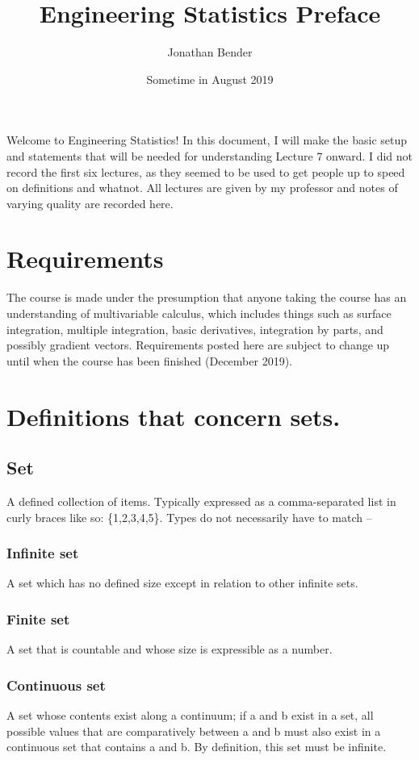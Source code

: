 \documentclass[]{article}
\title{Engineering Statistics Preface}
\author{Jonathan Bender}
\date{Sometime in August 2019}
\begin{document}
	\maketitle
	
	Welcome to Engineering Statistics! In this document, I will make the basic setup and statements that will be needed for understanding Lecture 7 onward. I did not record the first six lectures, as they seemed to be used to get people up to speed on definitions and whatnot. All lectures are given by my professor and notes of varying quality are recorded here.
	
	\section{Requirements}
		The course is made under the presumption that anyone taking the course has an understanding of multivariable calculus, which includes things such as surface integration, multiple integration, basic derivatives, integration by parts, and possibly gradient vectors. Requirements posted here are subject to change up until when the course has been finished (December 2019).
	
	\pagebreak
	\section{Definitions that concern sets.}
		\subsection{Set}
			A defined collection of items. Typically expressed as a comma-separated list in curly braces like so: \{1,2,3,4,5\}. Types do not necessarily have to match -- 
			\subsubsection{Infinite set}
				A set which has no defined size except in relation to other infinite sets.
			\subsubsection{Finite set}
				A set that is countable and whose size is expressible as a number.
			\subsubsection{Continuous set}
				A set whose contents exist along a continuum; if a and b exist in a set, all possible values that are comparatively between a and b must also exist in a continuous set that contains a and b. By definition, this set must be infinite.
\end{document}

